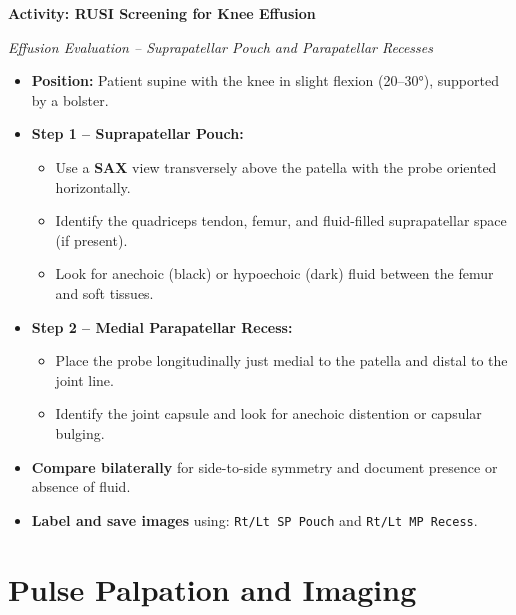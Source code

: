 \begin{labactivitybox}
\textbf{Activity: RUSI Screening for Knee Effusion}

\textit{Effusion Evaluation – Suprapatellar Pouch and Parapatellar Recesses}

\begin{itemize}
  \item \textbf{Position:} Patient supine with the knee in slight flexion (20–30°), supported by a bolster.
  \item \textbf{Step 1 – Suprapatellar Pouch:}
    \begin{itemize}
      \item Use a \textbf{SAX} view transversely above the patella with the probe oriented horizontally.
      \item Identify the quadriceps tendon, femur, and fluid-filled suprapatellar space (if present).
      \item Look for anechoic (black) or hypoechoic (dark) fluid between the femur and soft tissues.
    \end{itemize}
  \item \textbf{Step 2 – Medial Parapatellar Recess:}
    \begin{itemize}
      \item Place the probe longitudinally just medial to the patella and distal to the joint line.
      \item Identify the joint capsule and look for anechoic distention or capsular bulging.
    \end{itemize}
  \item \textbf{Compare bilaterally} for side-to-side symmetry and document presence or absence of fluid.
  \item \textbf{Label and save images} using: \texttt{Rt/Lt SP Pouch} and \texttt{Rt/Lt MP Recess}.
\end{itemize}
\end{labactivitybox}


\section*{Pulse Palpation and Imaging}

